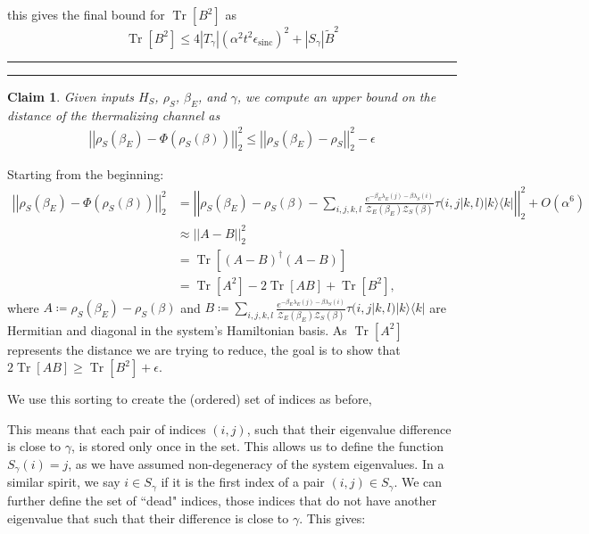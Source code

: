 \documentclass{article}
\newtheorem{claim}{Claim}
\newcommand{\ketbra}[2]{| #1\rangle\! \langle #2|}
\newcommand{\brackets}[1]{\left[ #1 \right]}
\newcommand{\norm}[1]{\left| \left| #1 \right| \right|}
\newcommand{\bigo}[1]{O\left( #1 \right)}
\DeclareMathOperator{\Tr}{Tr}
\newcommand{\trace}[1]{\Tr \brackets{ #1 }}
\newcommand{\partfun}{\mathcal{Z}}
\DeclareMathOperator{\sinc}{sinc}
\begin{document}
    this gives the final bound for $\trace{B^2}$ as
    \begin{equation}
        \trace{B^2} \leq 4 |T_{\gamma}| (\alpha^2 t^2 \epsilon_{\sinc})^2 + |S_{\gamma}| \widetilde{B}^2
    \end{equation}
    
    
    
    \newpage
    \noindent\rule{\textwidth}{1pt}
    \noindent\rule{\textwidth}{1pt}
    
    \begin{claim}
        Given inputs $H_S$, $\rho_S$, $\beta_E$, and $\gamma$, we compute an upper bound on the distance of the thermalizing channel as
        \begin{align}
            \norm{\rho_S(\beta_E) - \Phi(\rho_S(\beta))}_2^2 \leq \norm{\rho_S(\beta_E) - \rho_S}_2^2 - \epsilon
        \end{align}
        
    \end{claim}
    
    
    Starting from the beginning:
    \begin{align}
        \norm{\rho_S(\beta_E) - \Phi(\rho_S(\beta))}_2^2 &= \norm{\rho_S(\beta_E) - \rho_S(\beta) - \sum_{i,j,k,l} \frac{e^{-\beta_E \lambda_E(j) - \beta \lambda_S(i)}}{\partfun_E(\beta_E) \partfun_S(\beta)} \tau(i,j|k,l) \ketbra{k}{k} }_2^2 + \bigo{\alpha^6} \\
        &\approx \norm{A - B}_2^2 \\
        &= \trace{(A - B)^\dagger (A - B)} \\
        &= \trace{A^2} - 2 \trace{A B} + \trace{B^2},
    \end{align}
    where $A \coloneqq \rho_S(\beta_E) - \rho_S(\beta)$ and $B \coloneqq \sum_{i,j,k,l} \frac{e^{-\beta_E \lambda_E(j) - \beta \lambda_S(i)}}{\partfun_E(\beta_E) \partfun_S(\beta)} \tau(i,j|k,l) \ketbra{k}{k} $ are Hermitian and diagonal in the system's Hamiltonian basis. As $\trace{A^2}$ represents the distance we are trying to reduce, the goal is to show that $2 \trace{AB} \geq \trace{B^2} + \epsilon$. 
    
    We use this sorting to create the (ordered) set of indices as before,
    
    This means that each pair of indices $(i,j)$, such that their eigenvalue difference is close to $\gamma$, is stored only once in the set. This allows us to define the function $S_\gamma(i) = j$, as we have assumed non-degeneracy of the system eigenvalues. In a similar spirit, we say $i \in S_{\gamma}$ if it is the first index of a pair $(i,j) \in S_{\gamma}$. We can further define the set of ``dead" indices, those indices that do not have another eigenvalue that such that their difference is close to $\gamma$. This gives:
    
\end{document}
